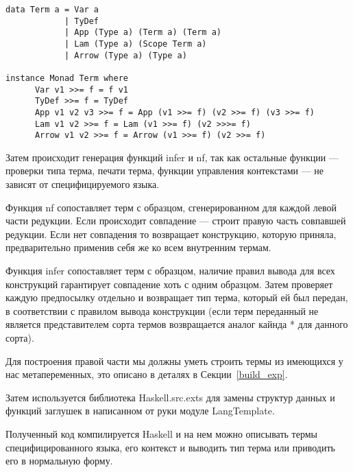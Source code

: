 \begin{lstlisting}[caption={Представление STLC и представитель класса Monad},captionpos=b, frame=single]
data Term a = Var a
            | TyDef
            | App (Type a) (Term a) (Term a)
            | Lam (Type a) (Scope Term a)
            | Arrow (Type a) (Type a)

instance Monad Term where
      Var v1 >>= f = f v1
      TyDef >>= f = TyDef
      App v1 v2 v3 >>= f = App (v1 >>= f) (v2 >>= f) (v3 >>= f)
      Lam v1 v2 >>= f = Lam (v1 >>= f) (v2 >>>= f)
      Arrow v1 v2 >>= f = Arrow (v1 >>= f) (v2 >>= f)
\end{lstlisting}


Затем происходит генерация функций infer и nf, так как остальные функции --- проверки типа терма, печати терма, функции управления контекстами --- не зависят от специфицируемого языка.

Функция nf сопоставляет терм с образцом, сгенерированном для каждой левой части редукции. Если происходит совпадение --- строит правую часть совпавшей редукции. Если нет совпадения то возвращает конструкцию, которую приняла, предварительно применив себя же ко всем внутренним термам.

Функция infer сопоставляет терм с образцом, наличие правил вывода для всех конструкций гарантирует совпадение хоть с одним образцом. Затем проверяет каждую предпосылку отдельно и возвращает тип терма, который ей был передан, в соответствии с правилом вывода конструкции (если терм переданный не является представителем сорта термов возвращается аналог кайнда * для данного сорта).

Для построения правой части мы должны уметь строить термы из имеющихся у нас метапеременных, это описано в деталях в Секции~\ref{build_exp}.

Затем используется библиотека Haskell.src.exts\cite{src_exts} для замены структур данных и функций заглушек в написанном от руки модуле LangTemplate.

Полученный код компилируется Haskell и на нем можно описывать термы специфицированного языка, его контекст и выводить тип терма или приводить его в нормальную форму.










